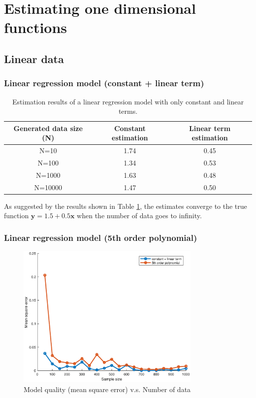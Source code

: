 \documentclass[]{article}
\begin{document}
\section{Estimating one dimensional functions}

\subsection{Linear data}

\subsubsection{Linear regression model (constant + linear term)}
\begin{table}[H]
	\centering
	\caption{Estimation results of a linear regression model with only constant and linear terms.}
	\label{tab:linear}
	\begin{tabular}{@{}ccc@{}}
		\toprule
		Generated data size (N) & Constant estimation & Linear term estimation \\ \midrule
		N=10        & 1.74                & 0.45                   \\
		N=100       & 1.34                & 0.53                   \\
		N=1000      & 1.63                & 0.48                   \\
		N=10000     & 1.47                & 0.50                   \\ \bottomrule
	\end{tabular}
\end{table}

As suggested by the results shown in Table \ref{tab:linear}, the estimates converge to the true function $\mathbf{y}=1.5+0.5\mathbf{x}$ when the number of data goes to infinity. 

\subsubsection{Linear regression model (5th order polynomial)}
\begin{figure}[H]
	\caption{Model quality (mean square error) v.s. Number of data}
	\centering
	\includegraphics[width=0.8\textwidth]{project3c}
\end{figure}
\end{document}
